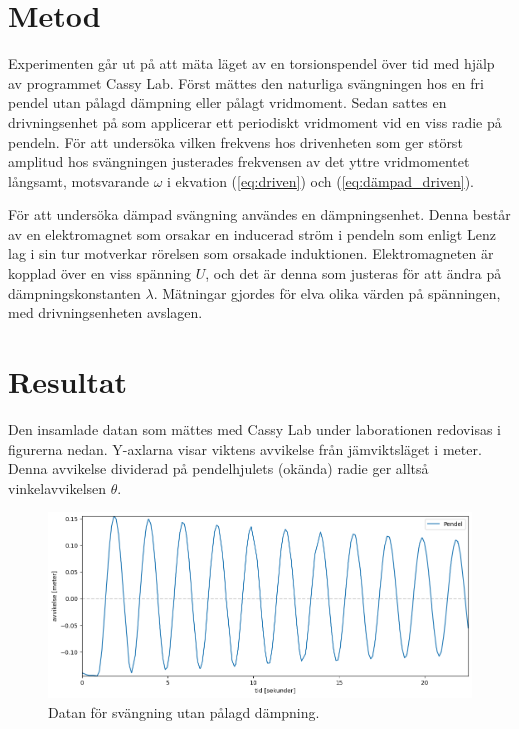 \documentclass[12pt, a4paper]{article}
\begin{document}
\section{Metod}
Experimenten går ut på att mäta läget av en torsionspendel över tid med hjälp av programmet Cassy Lab. Först mättes den naturliga svängningen hos en fri pendel utan pålagd dämpning eller pålagt vridmoment. Sedan sattes en drivningsenhet på som applicerar ett periodiskt vridmoment vid en viss radie på pendeln. För att undersöka vilken frekvens hos drivenheten som ger störst amplitud hos svängningen justerades frekvensen av det yttre vridmomentet långsamt, motsvarande $\omega$ i ekvation (\ref{eq:driven}) och (\ref{eq:dämpad_driven}). 

För att undersöka dämpad svängning användes en dämpningsenhet. Denna består av en elektromagnet som orsakar en inducerad ström i pendeln som enligt Lenz lag i sin tur motverkar rörelsen som orsakade induktionen. Elektromagneten är kopplad över en viss spänning $U$, och det är denna som justeras för att ändra på dämpningskonstanten $\lambda$. Mätningar gjordes för elva olika värden på spänningen, med drivningsenheten avslagen.

\clearpage
\section{Resultat}
Den insamlade datan som mättes med Cassy Lab under laborationen redovisas i figurerna nedan. Y-axlarna visar viktens avvikelse från jämviktsläget i meter. Denna avvikelse dividerad på pendelhjulets (okända) radie ger alltså vinkelavvikelsen $\theta$.

\begin{figure}[hp]
    \includegraphics[width=\textwidth]{graf_egenfrekvens}
    \caption{Datan för svängning utan pålagd dämpning.}
    \label{fig:data_egenfrekvens}
\end{figure}
\end{document}
